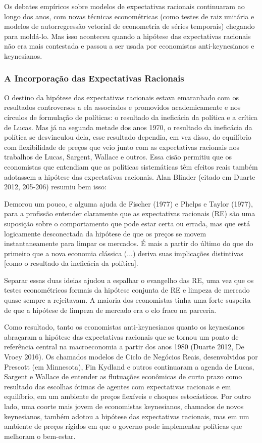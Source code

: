 \documentclass[a4paper,12pt]{article}[abntex2]
\begin{document}
Os debates empíricos sobre modelos de expectativas racionais continuaram ao longo dos anos, com novas técnicas econométricas (como testes de raiz unitária e modelos de autorregressão vetorial de econometria de séries temporais) chegando para moldá-lo. Mas isso aconteceu quando a hipótese das expectativas racionais não era mais contestada e passou a ser usada por economistas anti-keynesianos e keynesianos.

\subsubsection{\textbf{A Incorporação das Expectativas Racionais}}

O destino da hipótese das expectativas racionais estava emaranhado com os resultados controversos a ela associados e promovidos academicamente e nos círculos de formulação de políticas: o resultado da ineficácia da política e a crítica de Lucas. Mas já na segunda metade dos anos 1970, o resultado da ineficácia da política se desvinculou dela, esse resultado dependia, em vez disso, do equilíbrio com flexibilidade de preços que veio junto com as expectativas racionais nos trabalhos de Lucas, Sargent, Wallace e outros. Essa cisão permitiu que os economistas que entendiam que as políticas sistemáticas têm efeitos reais também adotassem a hipótese das expectativas racionais. Alan Blinder (citado em Duarte 2012, 205-206) resumiu bem isso:

Demorou um pouco, e alguma ajuda de Fischer (1977) e Phelps e Taylor (1977), para a profissão entender claramente que as expectativas racionais (RE) são uma suposição sobre o comportamento que pode estar certa ou errada, mas que está logicamente desconectada da hipótese de que os preços se movem instantaneamente para limpar os mercados. É mais a partir do último do que do primeiro que a nova economia clássica (...) deriva suas implicações distintivas [como o resultado da ineficácia da política].

Separar essas duas ideias ajudou a espalhar o evangelho das RE, uma vez que os testes econométricos formais da hipótese conjunta de RE e limpeza de mercado quase sempre a rejeitavam. A maioria dos economistas tinha uma forte suspeita de que a hipótese de limpeza de mercado era o elo fraco na parceria.

Como resultado, tanto os economistas anti-keynesianos quanto os keynesianos abraçaram a hipótese das expectativas racionais que se tornou um ponto de referência central na macroeconomia a partir dos anos 1980 (Duarte 2012, De Vroey 2016). Os chamados modelos de Ciclo de Negócios Reais, desenvolvidos por Prescott (em Minnesota), Fin Kydland e outros continuaram a agenda de Lucas, Sargent e Wallace de entender as flutuações econômicas de curto prazo como resultado das escolhas ótimas de agentes com expectativas racionais e em equilíbrio, em um ambiente de preços flexíveis e choques estocásticos. Por outro lado, uma coorte mais jovem de economistas keynesianos, chamados de novos keynesianos, também adotou a hipótese das expectativas racionais, mas em um ambiente de preços rígidos em que o governo pode implementar políticas que melhoram o bem-estar.
\end{document}

